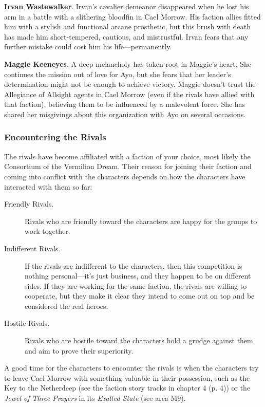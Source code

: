 \documentclass[letterpaper, 11pt, bg=full, twocolumn]{dndbook}
\begin{document}
\textbf{Irvan Wastewalker}. Irvan's cavalier demeanor disappeared when he lost his arm in a battle with a slithering bloodfin in Cael Morrow. His faction allies fitted him with a stylish and functional arcane prosthetic, but this brush with death has made him short-tempered, cautious, and mistrustful. Irvan fears that any further mistake could cost him his life---permanently.

\textbf{Maggie Keeneyes}. A deep melancholy has taken root in Maggie's heart. She continues the mission out of love for Ayo, but she fears that her leader's determination might not be enough to achieve victory. Maggie doesn't trust the Allegiance of Allsight agents in Cael Morrow (even if the rivals have allied with that faction), believing them to be influenced by a malevolent force. She has shared her misgivings about this organization with Ayo on several occasions.

\subsubsection{Encountering the Rivals}

The rivals have become affiliated with a faction of your choice, most likely the Consortium of the Vermilion Dream. Their reason for joining their faction and coming into conflict with the characters depends on how the characters have interacted with them so far:

\begin{description}
\item[Friendly Rivals.] Rivals who are friendly toward the characters are happy for the groups to work together.
\item[Indifferent Rivals.] If the rivals are indifferent to the characters, then this competition is nothing personal---it's just business, and they happen to be on different sides. If they are working for the same faction, the rivals are willing to cooperate, but they make it clear they intend to come out on top and be considered the real heroes.
\item[Hostile Rivals.] Rivals who are hostile toward the characters hold a grudge against them and aim to prove their superiority.
\end{description}

A good time for the characters to encounter the rivals is when the characters try to leave Cael Morrow with something valuable in their possession, such as the Key to the Netherdeep (see the faction story tracks in chapter 4 (p. 4)) or the \textit{Jewel of Three Prayers} in its \textit{Exalted State} (see area M9).
\end{document}
